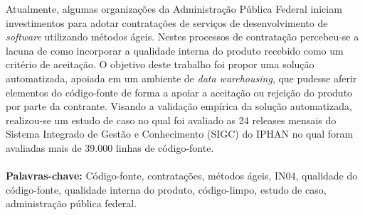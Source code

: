 \begin{resumo}

Atualmente, algumas organizações da Administração Pública Federal iniciam investimentos para adotar contratações de serviços de desenvolvimento de \textit{software} utilizando métodos ágeis. Nestes processos de contratação percebeu-se a lacuna de como incorporar a qualidade interna do produto recebido como um critério de aceitação. O objetivo deste trabalho foi propor uma solução automatizada, apoiada em um ambiente de \textit{data warehousing}, que pudesse aferir elementos do código-fonte de forma a apoiar a aceitação ou rejeição do produto por parte da contrante. Visando a validação empírica da solução automatizada, realizou-se um estudo de caso no qual foi avaliado as 24 releases mensais do Sistema Integrado de Gestão e Conhecimento (SIGC) do IPHAN no qual foram avaliadas mais de 39.000 linhas de código-fonte. 
{
\\
\\
\textbf{Palavras-chave:} Código-fonte, contratações, métodos ágeis, IN04, qualidade do código-fonte, qualidade interna do produto, código-limpo, estudo de caso, administração pública federal.}
\end{resumo}

